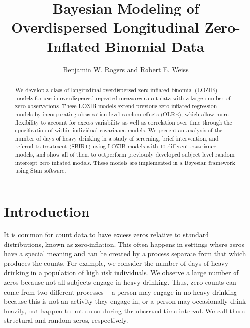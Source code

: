 \documentclass[12pt]{article}
\title{Bayesian Modeling of Overdispersed Longitudinal Zero-Inflated Binomial Data}
\author{Benjamin W. Rogers and Robert E. Weiss}
\begin{document}
\newcommand{\del}[2]{\frac{\partial {#1} }{\partial {#2}} }
\newcommand{\dby}[2]{\frac{d {#1} }{d {#2}} }
\newcommand{\sbar}{\overline{s}}
\newtheorem{proposition}{Proposition}

\theoremstyle{remark}
\newtheorem*{remark}{Remark}

\maketitle

\begin{abstract}
 We develop a class of longitudinal overdispersed zero-inflated binomial (LOZIB) models for use in overdispersed repeated measures count data with a large number of zero observations. These LOZIB models extend previous zero-inflated regression models by incorporating observation-level random effects (OLRE), which allow more flexibility to account for excess variability as well as correlation over time through the specification of within-individual covariance models. We present an analysis of the number of days of heavy drinking in a study of screening, brief intervention, and referral to treatment (SBIRT) using LOZIB models with 10 different covariance models, and show all of them to outperform previously developed subject level random intercept zero-inflated models. These models are implemented in a Bayesian framework using Stan software.
\end{abstract}

\section{Introduction}
\label{s:intro}


It is common for count data to have excess zeros relative to standard distributions, known as zero-inflation. This often happens in settings where zeros have a special meaning and can be created by a process separate from that which produces the counts. For example, we consider the number of days of heavy drinking in a population of high risk individuals. We observe a large number of zeros because not all subjects engage in heavy drinking. Thus, zero counts can come from two different processes -- a person may engage in no heavy drinking because this is not an activity they engage in, or a person may occasionally drink heavily, but happen to not do so during the observed time interval. We call these structural and random zeros, respectively.
\end{document}
